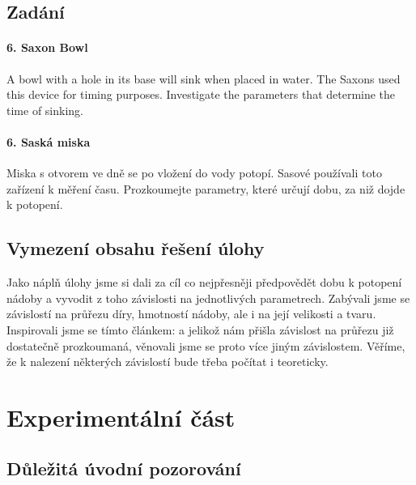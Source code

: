 \documentclass[14pt,a4paper]{article}
\begin{document}
\subsection{Zadání}
\paragraph{6. Saxon Bowl}
A bowl with a hole in its base will sink when placed in water. The Saxons used this device for timing purposes. Investigate the parameters that determine the time of sinking.
\paragraph{6. Saská miska}
Miska s otvorem ve dně se po vložení do vody potopí. Sasové používali toto zařízení k měření času. Prozkoumejte parametry, které určují dobu, za niž dojde k potopení.
\subsection{Vymezení obsahu řešení úlohy}
Jako náplň úlohy jsme si dali za cíl co nejpřesněji předpovědět dobu k potopení nádoby a vyvodit z toho závislosti na jednotlivých parametrech.
Zabývali jsme se závislostí na průřezu díry, hmotností nádoby, ale i na její velikosti a tvaru. Inspirovali jsme se tímto článkem: \cite{1} a jelikož nám přišla závislost na průřezu již dostatečně prozkoumaná, věnovali jsme se proto více jiným závislostem. Věříme, že k nalezení některých závislostí bude třeba počítat i teoreticky.
\newpage
\section{Experimentální část}
\subsection{Důležitá úvodní pozorování}
\end{document}
